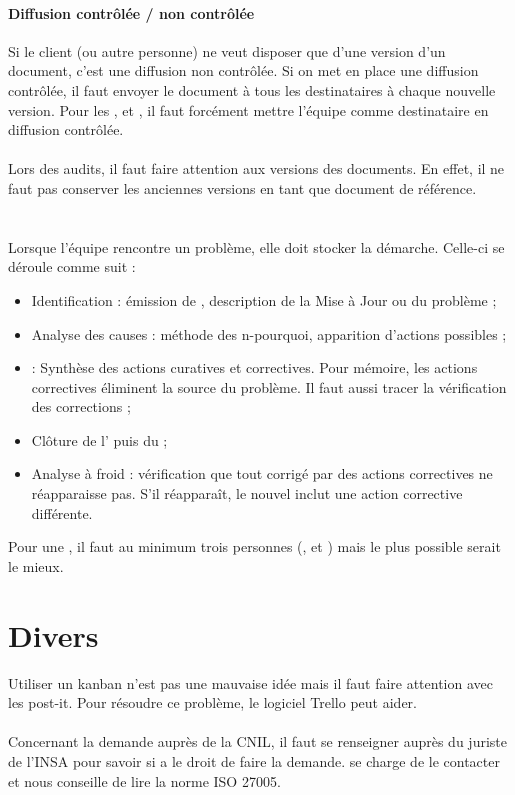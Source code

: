 \documentclass [a4paper] {article}
\begin{document}
\paragraph*{Diffusion contrôlée / non contrôlée}
Si le client (ou autre personne) ne veut disposer que d'une version d'un document, c'est une diffusion non contrôlée. Si on met en place une diffusion contrôlée, il faut envoyer le document à tous les destinataires à chaque nouvelle version. Pour les \DSE{}, \DSI{} et \PQ{}, il faut forcément mettre l'équipe comme destinataire en diffusion contrôlée.

\paragraph*{}
Lors des audits, il faut faire attention aux versions des documents. En effet, il ne faut pas conserver les anciennes versions en tant que document de référence.


\section{\FT}
Lorsque l'équipe rencontre un problème, elle doit stocker la démarche.  Celle-ci se déroule comme suit :

\begin{itemize}
\item Identification : émission de \FFT{}, description de la Mise à Jour ou du problème ;
\item Analyse des causes : méthode des n-pourquoi, apparition d'actions possibles ;
\item \OC : Synthèse des actions curatives et correctives. Pour mémoire, les actions correctives éliminent la source du problème. Il faut aussi tracer la vérification des corrections ;
\item Clôture de l'\OC{} puis du \FT{} ;
\item Analyse à froid : vérification que tout \FT{} corrigé par des actions correctives ne réapparaisse pas. S'il réapparaît, le nouvel \OC{} inclut une action corrective différente.
\end{itemize}

Pour une \CTFT{}, il faut au minimum trois personnes (\CP{}, \RQ{} et \RGC{}) mais le plus possible serait le mieux.


\section{Divers}

Utiliser un kanban n'est pas une mauvaise idée mais il faut faire attention avec les post-it. Pour résoudre ce problème, le logiciel Trello peut aider.

\paragraph*{}
Concernant la demande auprès de la CNIL, il faut se renseigner auprès du juriste de l'INSA pour savoir si \Sergi{} a le droit de faire la demande. \nomTuteurQualite{} se charge de le contacter et nous conseille de lire la norme ISO 27005.
\end{document}
